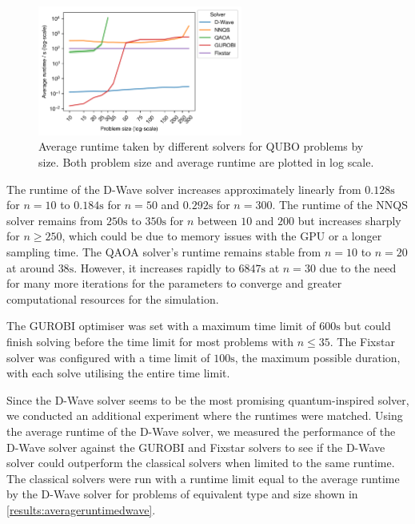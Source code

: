 \begin{figure}[!htb]
    \centering
    \includegraphics[width=0.6\textwidth]{images/all_time_average.png}
    \caption{Average runtime taken by different solvers for QUBO problems by size. Both problem size and average runtime are plotted in log scale.}
    \label{results:timeaverage}
\end{figure}

The runtime of the D-Wave solver increases approximately linearly from $0.128\si{\second}$ for $n=10$ to $0.184\si{\second}$ for $n=50$ and $0.292\si{\second}$ for $n=300$. The runtime of the NNQS solver remains from $250\si{\second}$ to $350\si{\second}$ for $n$ between $10$ and $200$ but increases sharply for $n \geq 250$, which could be due to memory issues with the GPU or a longer sampling time. The QAOA solver's runtime remains stable from $n=10$ to $n=20$ at around $38 \si{\second}$. However, it increases rapidly to $6847 \si{\second}$ at $n=30$ due to the need for many more iterations for the parameters to converge and greater computational resources for the simulation.

The GUROBI optimiser was set with a maximum time limit of $600 \si{\second}$ but could finish solving before the time limit for most problems with $n \leq 35$. The Fixstar solver was configured with a time limit of $100 \si{\second}$, the maximum possible duration, with each solve utilising the entire time limit.

Since the D-Wave solver seems to be the most promising quantum-inspired solver, we conducted an additional experiment where the runtimes were matched. Using the average runtime of the D-Wave solver, we measured the performance of the D-Wave solver against the GUROBI and Fixstar solvers to see if the D-Wave solver could outperform the classical solvers when limited to the same runtime. The classical solvers were run with a runtime limit equal to the average runtime by the D-Wave solver for problems of equivalent type and size shown in \autoref{results:averageruntimedwave}.

